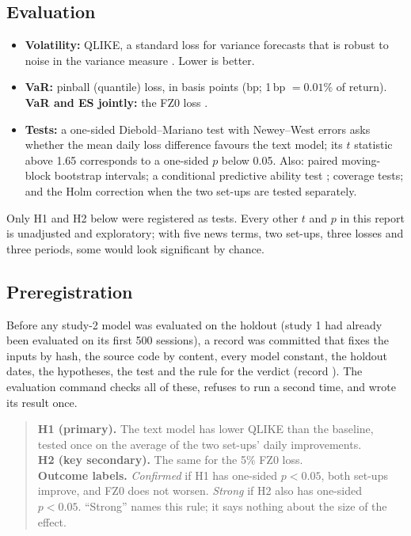 \documentclass[11pt,a4paper]{article}
\begin{document}
\subsection{Evaluation}
\begin{itemize}
\item \textbf{Volatility:} QLIKE, a standard loss for variance forecasts that is robust to noise
in the variance measure \cite{patton}. Lower is better.
\item \textbf{VaR:} pinball (quantile) loss, in basis points (bp; 1\,bp $=0.01\%$ of return).
\textbf{VaR and ES jointly:} the FZ0 loss \cite{fz,pzc}.
\item \textbf{Tests:} a one-sided Diebold--Mariano test with Newey--West errors \cite{dm} asks
whether the mean daily loss difference favours the text model; its $t$ statistic above 1.65
corresponds to a one-sided $p$ below 0.05. Also: paired moving-block bootstrap intervals; a
conditional predictive ability test \cite{gw}; coverage tests; and the Holm correction when
the two set-ups are tested separately.
\end{itemize}
Only H1 and H2 below were registered as tests. Every other $t$ and $p$ in this report is
unadjusted and exploratory; with five news terms, two set-ups, three losses and three periods,
some would look significant by chance.

\subsection{Preregistration}
Before any study-2 model was evaluated on the holdout (study 1 had already been evaluated on its
first 500 sessions), a record was committed that fixes the inputs by hash,
the source code by content, every model constant, the holdout dates, the hypotheses, the test
and the rule for the verdict (record \texttt{\RegistrationId}). The evaluation command checks
all of these, refuses to run a second time, and wrote its result once.

\begin{quote}
\textbf{H1 (primary).} The text model has lower QLIKE than the baseline, tested once on the
average of the two set-ups' daily improvements.\\
\textbf{H2 (key secondary).} The same for the 5\% FZ0 loss.\\
\textbf{Outcome labels.} \emph{Confirmed} if H1 has one-sided $p<0.05$, both set-ups improve,
and FZ0 does not worsen. \emph{Strong} if H2 also has one-sided $p<0.05$. ``Strong'' names
this rule; it says nothing about the size of the effect.
\end{quote}
\end{document}
